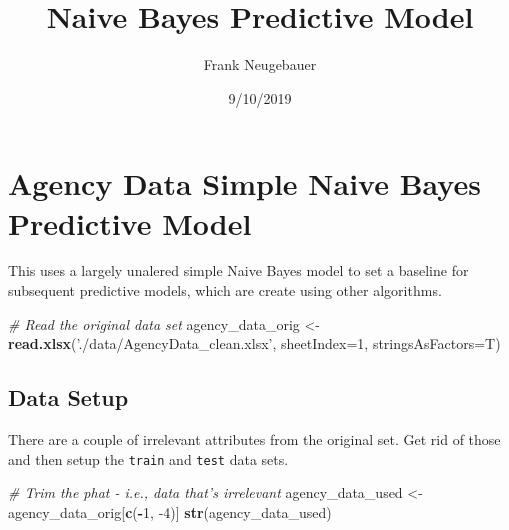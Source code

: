 \documentclass[]{article}
\title{Naive Bayes Predictive Model}
\author{Frank Neugebauer}
\date{9/10/2019}
\newenvironment{Shaded}{\begin{snugshade}}{\end{snugshade}}
\newcommand{\CommentTok}[1]{\textcolor[rgb]{0.56,0.35,0.01}{\textit{#1}}}
\newcommand{\DataTypeTok}[1]{\textcolor[rgb]{0.13,0.29,0.53}{#1}}
\newcommand{\DecValTok}[1]{\textcolor[rgb]{0.00,0.00,0.81}{#1}}
\newcommand{\KeywordTok}[1]{\textcolor[rgb]{0.13,0.29,0.53}{\textbf{#1}}}
\newcommand{\NormalTok}[1]{#1}
\newcommand{\OperatorTok}[1]{\textcolor[rgb]{0.81,0.36,0.00}{\textbf{#1}}}
\newcommand{\StringTok}[1]{\textcolor[rgb]{0.31,0.60,0.02}{#1}}
\begin{document}
\maketitle

\hypertarget{agency-data-simple-naive-bayes-predictive-model}{%
\section{Agency Data Simple Naive Bayes Predictive
Model}\label{agency-data-simple-naive-bayes-predictive-model}}

This uses a largely unalered simple Naive Bayes model to set a baseline
for subsequent predictive models, which are create using other
algorithms.

\begin{Shaded}
\begin{Highlighting}[]
\CommentTok{# Read the original data set}
\NormalTok{agency_data_orig <-}\StringTok{ }\KeywordTok{read.xlsx}\NormalTok{(}\StringTok{'./data/AgencyData_clean.xlsx'}\NormalTok{, }\DataTypeTok{sheetIndex=}\DecValTok{1}\NormalTok{, }\DataTypeTok{stringsAsFactors=}\NormalTok{T)}
\end{Highlighting}
\end{Shaded}

\hypertarget{data-setup}{%
\subsection{Data Setup}\label{data-setup}}

There are a couple of irrelevant attributes from the original set. Get
rid of those and then setup the \texttt{train} and \texttt{test} data
sets.

\begin{Shaded}
\begin{Highlighting}[]
\CommentTok{# Trim the phat - i.e., data that's irrelevant}
\NormalTok{agency_data_used <-}\StringTok{ }\NormalTok{agency_data_orig[}\KeywordTok{c}\NormalTok{(}\OperatorTok{-}\DecValTok{1}\NormalTok{, }\DecValTok{-4}\NormalTok{)]}
\KeywordTok{str}\NormalTok{(agency_data_used)}
\end{Highlighting}
\end{Shaded}
\end{document}
